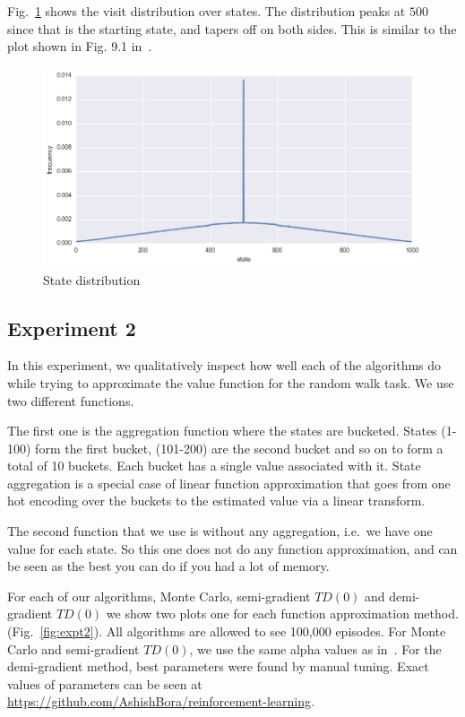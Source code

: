 \documentclass{article}
\begin{document}
    Fig.~\ref{fig:state_dist} shows the visit distribution over states. The distribution peaks at $500$ since that is the starting state, and tapers off on both sides. This is similar to the plot shown in Fig. 9.1 in~\cite{RLbook}.
    \begin{figure}
        \centering
        \includegraphics[width=\textwidth]{distribution}
        \caption{State distribution}\label{fig:state_dist}
    \end{figure}

\subsection{Experiment 2}
    In this experiment, we qualitatively inspect how well each of the algorithms do while trying to approximate the value function for the random walk task. We use two different functions.

    The first one is the aggregation function where the states are bucketed. States (1-100) form the first bucket, (101-200) are the second bucket and so on to form a total of 10 buckets. Each bucket has a single value associated with it. State aggregation is a special case of linear function approximation that goes from one hot encoding over the buckets to the estimated value via a linear transform.

    The second function that we use is without any aggregation, i.e.\ we have one value for each state. So this one does not do any function approximation, and can be seen as the best you can do if you had a lot of memory.

    For each of our algorithms, Monte Carlo, semi-gradient $TD(0)$ and demi-gradient $TD(0)$ we show two plots one for each function approximation method. (Fig.~\ref{fig:expt2}). All algorithms are allowed to see 100,000 episodes. For Monte Carlo and semi-gradient $TD(0)$, we use the same alpha values as in~\cite{RLbook}. For the demi-gradient method, best parameters were found by manual tuning. Exact values of parameters can be seen at \url{https://github.com/AshishBora/reinforcement-learning}.
\end{document}
